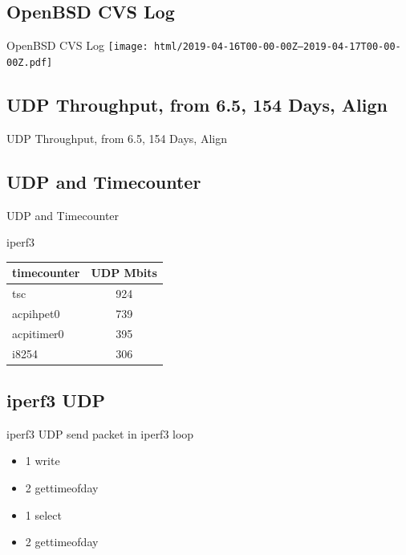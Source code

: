 \documentclass[14pt,aspectratio=169]{beamer}
\begin{document}
\subsection{OpenBSD CVS Log}
\begin{frame}{OpenBSD CVS Log}
    \texttt{[image: html/2019-04-16T00-00-00Z--2019-04-17T00-00-00Z.pdf]}
\end{frame}

\subsection{UDP Throughput, from 6.5, 154 Days, Align}
\begin{frame}{UDP Throughput, from 6.5, 154 Days, Align}
\end{frame}

\subsection{UDP and Timecounter}
\begin{frame}{UDP and Timecounter}
\begin{center}
iperf3

\vspace{1cm}
\begin{tabular}{l|c}
    timecounter	& UDP Mbits \\
    \hline
    tsc		& 924 \\
    acpihpet0	& 739 \\
    acpitimer0	& 395 \\
    i8254	& 306 \\
\end{tabular}
\end{center}
\end{frame}

\subsection{iperf3 UDP}
\begin{frame}{iperf3 UDP}
send packet in iperf3 loop
\begin{itemize}
    \item 1 write
    \item 2 gettimeofday
    \item 1 select
    \item 2 gettimeofday
\end{itemize}
\end{frame}
\end{document}
